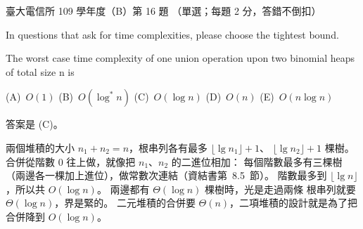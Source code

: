 \begin{pastexam}[label={px:ntu-109-comm-dsa-16}]{臺大電信所 109 學年度（B）第 16 題}
（單選；每題 2 分，答錯不倒扣）

In questions that ask for time complexities, please choose the tightest bound.

The worst case time complexity of one union operation upon two binomial heaps of total size n is

(A)~$O(1)$ \qquad (B)~$O(\log^* n)$ \qquad (C)~$O(\log n)$ \qquad (D)~$O(n)$ \qquad (E)~$O(n\log n)$
\end{pastexam}

\begin{pastsoln}
答案是 (C)。

兩個堆積的大小 $n_1 + n_2 = n$，根串列各有最多 $\lfloor \lg n_1 \rfloor + 1$、
$\lfloor \lg n_2 \rfloor + 1$ 棵樹。 合併從階數 $0$ 往上做，就像把 $n_1$、$n_2$ 的二進位相加：
每個階數最多有三棵樹（兩邊各一棵加上進位），做常數次連結（資結書第~8.5~節）。 階數最多到
$\lfloor \lg n \rfloor$，所以共 $O(\log n)$。 兩邊都有 $\Theta(\log n)$ 棵樹時，光是走過兩條
根串列就要 $\Theta(\log n)$，界是緊的。 二元堆積的合併要 $\Theta(n)$，二項堆積的設計就是為了把
合併降到 $O(\log n)$。
\end{pastsoln}
